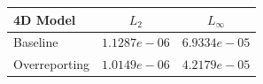 \begin{table}[ht]
\centering
\begin{tabular}{lcc}
\hline
4D Model & $L_2$ & $L_\infty$ \\
\hline
Baseline & $1.1287e-06$ & $6.9334e-05$ \\
Overreporting & $1.0149e-06$ & $4.2179e-05$ \\
\hline
\end{tabular}
\end{table}
